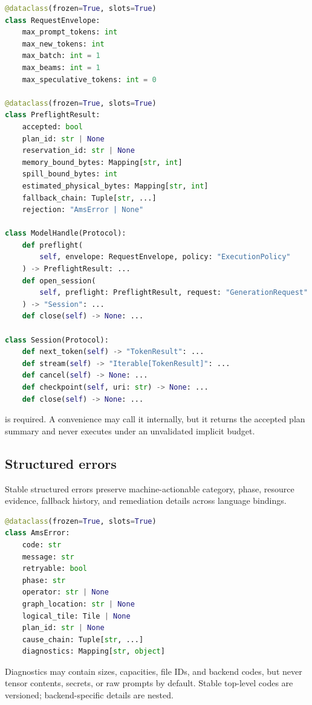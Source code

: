\begin{lstlisting}[language=Python,caption={Public model/session API.}]
@dataclass(frozen=True, slots=True)
class RequestEnvelope:
    max_prompt_tokens: int
    max_new_tokens: int
    max_batch: int = 1
    max_beams: int = 1
    max_speculative_tokens: int = 0

@dataclass(frozen=True, slots=True)
class PreflightResult:
    accepted: bool
    plan_id: str | None
    reservation_id: str | None
    memory_bound_bytes: Mapping[str, int]
    spill_bound_bytes: int
    estimated_physical_bytes: Mapping[str, int]
    fallback_chain: Tuple[str, ...]
    rejection: "AmsError | None"

class ModelHandle(Protocol):
    def preflight(
        self, envelope: RequestEnvelope, policy: "ExecutionPolicy"
    ) -> PreflightResult: ...
    def open_session(
        self, preflight: PreflightResult, request: "GenerationRequest"
    ) -> "Session": ...
    def close(self) -> None: ...

class Session(Protocol):
    def next_token(self) -> "TokenResult": ...
    def stream(self) -> "Iterable[TokenResult]": ...
    def cancel(self) -> None: ...
    def checkpoint(self, uri: str) -> None: ...
    def close(self) -> None: ...
\end{lstlisting}

 is required. A convenience  may call it internally, but it returns the accepted plan summary and never executes under an unvalidated implicit budget.

\subsection{Structured errors}

Stable structured errors preserve machine-actionable category, phase, resource evidence, fallback history, and remediation details across language bindings.

\begin{lstlisting}[language=Python,caption={Stable error payload.}]
@dataclass(frozen=True, slots=True)
class AmsError:
    code: str
    message: str
    retryable: bool
    phase: str
    operator: str | None
    graph_location: str | None
    logical_tile: Tile | None
    plan_id: str | None
    cause_chain: Tuple[str, ...]
    diagnostics: Mapping[str, object]
\end{lstlisting}

Diagnostics may contain sizes, capacities, file IDs, and backend codes, but never tensor contents, secrets, or raw prompts by default. Stable top-level codes are versioned; backend-specific details are nested.

